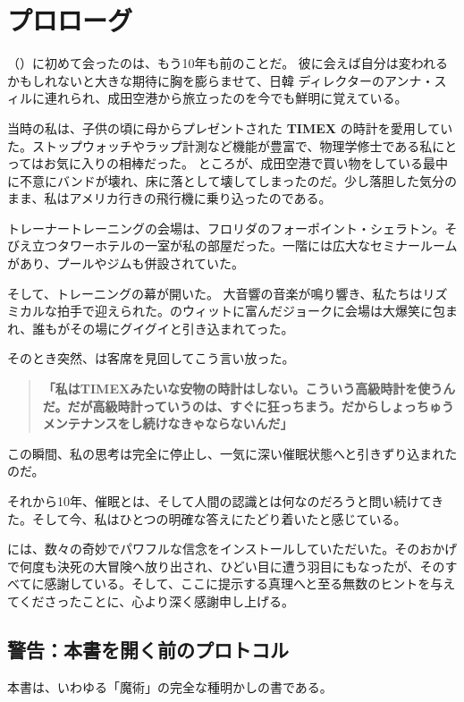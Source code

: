 \ifja
    \chapter*{プロローグ}
    
    \jaDrBandler （\fullDrBandler ）に初めて会ったのは、もう10年も前のことだ。
    彼に会えば自分は変われるかもしれないと大きな期待に胸を膨らませて、日韓 \abbrNLP ディレクターのアンナ・スィルに連れられ、成田空港から旅立ったのを今でも鮮明に覚えている。

    当時の私は、子供の頃に母からプレゼントされた \textbf{TIMEX} の時計を愛用していた。ストップウォッチやラップ計測など機能が豊富で、物理学修士である私にとってはお気に入りの相棒だった。
    ところが、成田空港で買い物をしている最中に不意にバンドが壊れ、床に落として壊してしまったのだ。少し落胆した気分のまま、私はアメリカ行きの飛行機に乗り込ったのである。

    トレーナートレーニングの会場は、フロリダのフォーポイント・シェラトン。そびえ立つタワーホテルの一室が私の部屋だった。一階には広大なセミナールームがあり、プールやジムも併設されていた。

    そして、トレーニングの幕が開いた。
    大音響の音楽が鳴り響き、私たちはリズミカルな拍手で迎えられた。\jaBandlerShort のウィットに富んだジョークに会場は大爆笑に包まれ、誰もがその場にグイグイと引き込まれてった。

    そのとき突然、\jaBandlerShort は客席を見回してこう言い放った。
    \begin{quote}
        \textbf{「私はTIMEXみたいな安物の時計はしない。こういう高級時計を使うんだ。だが高級時計っていうのは、すぐに狂っちまう。だからしょっちゅうメンテナンスをし続けなきゃならないんだ」}
    \end{quote}

    この瞬間、私の思考は完全に停止し、一気に深い催眠状態へと引きずり込まれたのだ。

    それから10年、催眠とは、そして人間の認識とは何なのだろうと問い続けてきた。そして今、私はひとつの明確な答えにたどり着いたと感じている。

    \jaBandlerDr には、数々の奇妙でパワフルな信念をインストールしていただいた。そのおかげで何度も決死の大冒険へ放り出され、ひどい目に遭う羽目にもなったが、そのすべてに感謝している。そして、ここに提示する真理へと至る無数のヒントを与えてくださったことに、心より深く感謝申し上げる。

    \section*{警告：本書を開く前のプロトコル}
    本書は、いわゆる「魔術」の完全な種明かしの書である。


